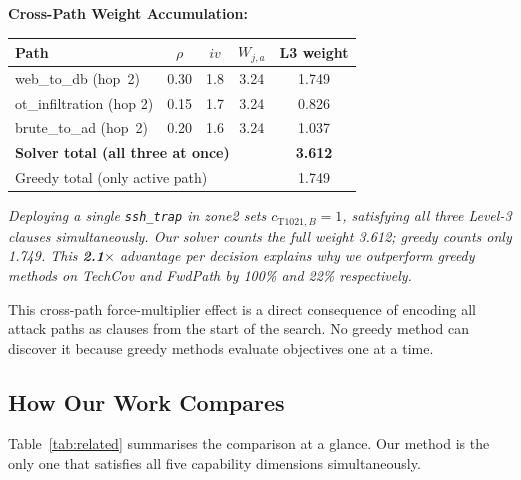 \documentclass[journal]{IEEEtran}
\begin{document}
\begin{examplebox}
\textbf{Cross-Path Weight Accumulation:}
\begin{center}
\small
\renewcommand{\arraystretch}{1.15}
\begin{tabular}{@{}lcccc@{}}
\toprule
\textbf{Path} & $\rho$ & $iv$ & $W_{j,a}$ & \textbf{L3 weight}\\
\midrule
web\_to\_db (hop~2)    & 0.30 & 1.8 & 3.24 & 1.749 \\
ot\_infiltration (hop 2)& 0.15 & 1.7 & 3.24 & 0.826 \\
brute\_to\_ad (hop~2)  & 0.20 & 1.6 & 3.24 & 1.037 \\
\midrule
\multicolumn{4}{l}{\textbf{Solver total (all three at once)}}
  & \textbf{3.612} \\
\multicolumn{4}{l}{Greedy total (only active path)}
  & 1.749 \\
\bottomrule
\end{tabular}
\end{center}
\textit{Deploying a single \texttt{ssh\_trap} in zone2 sets
$c_{\text{T1021},B}=1$, satisfying all three Level-3
clauses simultaneously.
Our solver counts the full weight 3.612; greedy counts only
1.749.
This \textbf{2.1$\times$} advantage per decision explains
why we outperform greedy methods on TechCov and FwdPath
by 100\% and 22\% respectively.}
\end{examplebox}

This cross-path force-multiplier effect is a direct
consequence of encoding all attack paths as clauses from the
start of the search.
No greedy method can discover it because greedy methods
evaluate objectives one at a time.

\subsection{How Our Work Compares}
\label{subsec:compare}

Table~\ref{tab:related} summarises the comparison at a glance.
Our method is the only one that satisfies all five capability
dimensions simultaneously.
\end{document}
